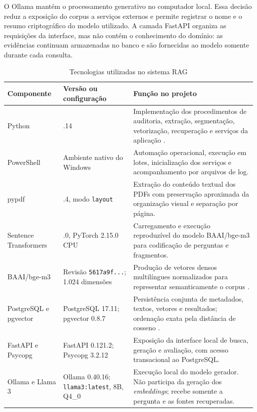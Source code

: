 O Ollama mantém o processamento generativo no computador local. Essa decisão reduz a exposição do corpus a serviços externos e permite registrar o nome e o resumo criptográfico do modelo utilizado. A camada FastAPI organiza as requisições da interface, mas não contém o conhecimento do domínio: as evidências continuam armazenadas no banco e são fornecidas ao modelo somente durante cada consulta.

\begin{table}[!htbp]
\centering
\caption{Tecnologias utilizadas no sistema RAG}
\label{tab:tecnologias-utilizadas}
\renewcommand{\arraystretch}{1.18}
\small
\begin{tabularx}{\textwidth}{>{\raggedright\arraybackslash}p{3.1cm}>{\raggedright\arraybackslash}p{3.5cm}>{\raggedright\arraybackslash}X}
\toprule
\textbf{Componente} & \textbf{Versão ou configuração} & \textbf{Função no projeto} \\ \midrule
Python & 3.12.14 & Implementação dos procedimentos de auditoria, extração, segmentação, vetorização, recuperação e serviços da aplicação \cite{python}. \\
PowerShell & Ambiente nativo do Windows & Automação operacional, execução em lotes, inicialização dos serviços e acompanhamento por arquivos de log. \\
pypdf & 6.21.4, modo \texttt{layout} & Extração do conteúdo textual dos PDFs com preservação aproximada da organização visual e separação por página. \\
Sentence Transformers & 6.3.0, PyTorch 2.15.0 CPU & Carregamento e execução reproduzível do modelo BAAI/bge-m3 para codificação de perguntas e fragmentos. \\
BAAI/bge-m3 & Revisão \texttt{5617a9f...}; 1.024 dimensões & Produção de vetores densos multilíngues normalizados para representar semanticamente o corpus \cite{chen2024bgem3}. \\
PostgreSQL e pgvector & PostgreSQL 17.11; pgvector 0.8.7 & Persistência conjunta de metadados, textos, vetores e resultados; ordenação exata pela distância de cosseno \cite{postgresql,pgvector}. \\
FastAPI e Psycopg & FastAPI 0.121.2; Psycopg 3.2.12 & Exposição da interface local de busca, geração e avaliação, com acesso transacional ao PostgreSQL. \\
Ollama e Llama 3 & Ollama 0.40.16; \texttt{llama3:latest}, 8B, Q4\_0 & Execução local do modelo gerador. Não participa da geração dos \textit{embeddings}; recebe somente a pergunta e as fontes recuperadas. \\ \bottomrule
\end{tabularx}
\end{table}
